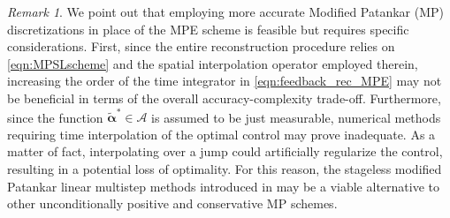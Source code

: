 \documentclass[10pt]{article}
\theoremstyle{remark}
\newtheorem{remark}{Remark}[section]
\theoremstyle{definition}
\theoremstyle{remark}
\begin{document}
\begin{remark} \label{rmk:nointerp}
    We point out that employing more accurate Modified Patankar (MP) discretizations in place of the MPE scheme is feasible but requires specific considerations. First, since the entire reconstruction procedure relies on \eqref{eqn:MPSLscheme} and the spatial interpolation operator employed therein, increasing the order of the time integrator in \eqref{eqn:feedback_rec_MPE} may not be beneficial in terms of the overall accuracy-complexity trade-off. Furthermore, since the function $\tilde{\bm{\alpha}}^* \in \mathcal{A}$ is assumed to be just measurable, numerical methods requiring time interpolation of the optimal control may prove inadequate. As a matter of fact, interpolating over a jump could artificially regularize the control, resulting in a potential loss of optimality. For this reason, the stageless modified Patankar linear multistep methods introduced in \cite{MPLM} may be a viable alternative to other unconditionally positive and conservative MP schemes. 
\end{remark}
\end{document}
